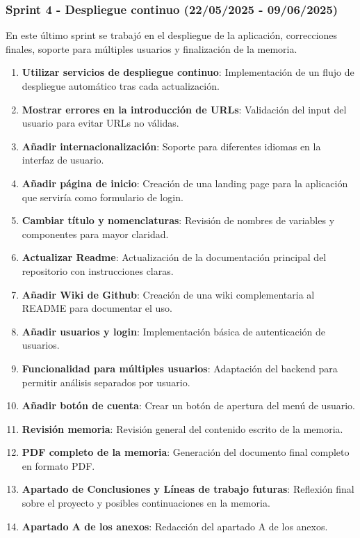 \subsubsection{Sprint 4 - Despliegue continuo (22/05/2025 - 09/06/2025)}

En este último sprint se trabajó en el despliegue de la aplicación, correcciones finales, soporte para múltiples usuarios y finalización de la memoria.

\begin{enumerate}
\item \textbf{Utilizar servicios de despliegue continuo}: Implementación de un flujo de despliegue automático tras cada actualización.
\item \textbf{Mostrar errores en la introducción de URLs}: Validación del input del usuario para evitar URLs no válidas.
\item \textbf{Añadir internacionalización}: Soporte para diferentes idiomas en la interfaz de usuario.
\item \textbf{Añadir página de inicio}: Creación de una landing page para la aplicación que serviría como formulario de login.
\item \textbf{Cambiar título y nomenclaturas}: Revisión de nombres de variables y componentes para mayor claridad.
\item \textbf{Actualizar Readme}: Actualización de la documentación principal del repositorio con instrucciones claras.
\item \textbf{Añadir Wiki de Github}: Creación de una wiki complementaria al README para documentar el uso.
\item \textbf{Añadir usuarios y login}: Implementación básica de autenticación de usuarios.
\item \textbf{Funcionalidad para múltiples usuarios}: Adaptación del backend para permitir análisis separados por usuario.
\item \textbf{Añadir botón de cuenta}: Crear un botón de apertura del menú de usuario.
\item \textbf{Revisión memoria}: Revisión general del contenido escrito de la memoria.
\item \textbf{PDF completo de la memoria}: Generación del documento final completo en formato PDF.
\item \textbf{Apartado de Conclusiones y Líneas de trabajo futuras}: Reflexión final sobre el proyecto y posibles continuaciones en la memoria.
\item \textbf{Apartado A de los anexos}: Redacción del apartado A de los anexos.

\end{enumerate}
